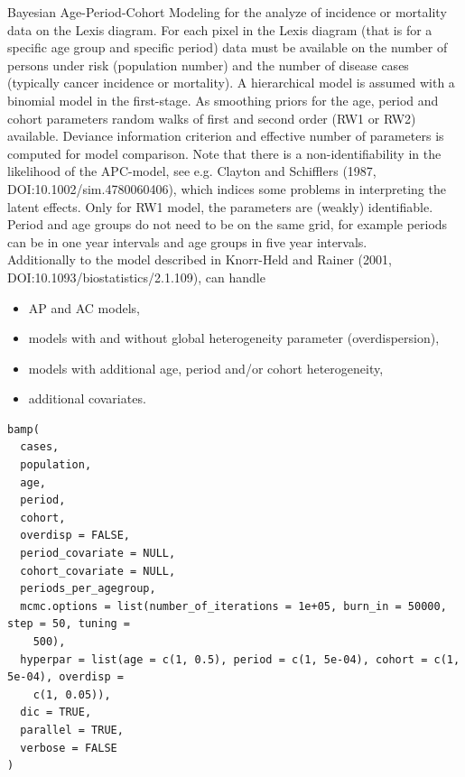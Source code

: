 \documentclass[a4paper]{book}
\begin{document}
%
\begin{Description}
Bayesian Age-Period-Cohort Modeling for the analyze of incidence or mortality data on the Lexis diagram.
For each pixel in the Lexis diagram (that is for a specific age group and specific period) data must be available on the number of persons under risk (population number) and the number of disease cases (typically cancer incidence or mortality).
A hierarchical model is assumed with a binomial model in the first-stage. As smoothing priors for the age, period and cohort parameters random walks of first and second order (RW1 or RW2) available.
Deviance information criterion and effective number of parameters is computed for model comparison.
Note that there is a non-identifiability in the likelihood of the APC-model, see e.g. Clayton and Schifflers (1987, DOI:10.1002/sim.4780060406), which indices some problems in interpreting the latent effects. Only for RW1 model, the parameters are (weakly) identifiable.
Period and age groups do not need to be on the same grid, for example periods can be in one year intervals and age groups in five year intervals.\\{}
Additionally to the model described in Knorr-Held and Rainer (2001, DOI:10.1093/biostatistics/2.1.109),  can handle 
\begin{itemize}
\item{} AP and AC models, 
\item{} models with and without global heterogeneity parameter (overdispersion),
\item{} models with additional age, period and/or cohort heterogeneity,
\item{} additional covariates.
\end{itemize}

\end{Description}
%
\begin{Usage}
\begin{verbatim}
bamp(
  cases,
  population,
  age,
  period,
  cohort,
  overdisp = FALSE,
  period_covariate = NULL,
  cohort_covariate = NULL,
  periods_per_agegroup,
  mcmc.options = list(number_of_iterations = 1e+05, burn_in = 50000, step = 50, tuning =
    500),
  hyperpar = list(age = c(1, 0.5), period = c(1, 5e-04), cohort = c(1, 5e-04), overdisp =
    c(1, 0.05)),
  dic = TRUE,
  parallel = TRUE,
  verbose = FALSE
)
\end{verbatim}
\end{Usage}
%
\end{document}
